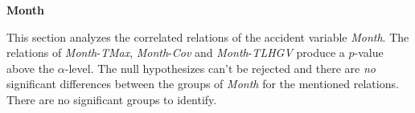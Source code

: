 
\Large
\centerline{\textbf{Month}}
\normalsize
This section analyzes the correlated relations of the accident variable \textit{Month}. The relations of \textit{Month}-\textit{TMax}, \textit{Month}-\textit{Cov} and \textit{Month}-\textit{TLHGV} produce a $p$-value above the $\alpha$-level. The null hypothesizes can't be rejected and there are \textit{no} significant differences between the groups of \textit{Month} for the mentioned relations. There are no significant groups to identify.



